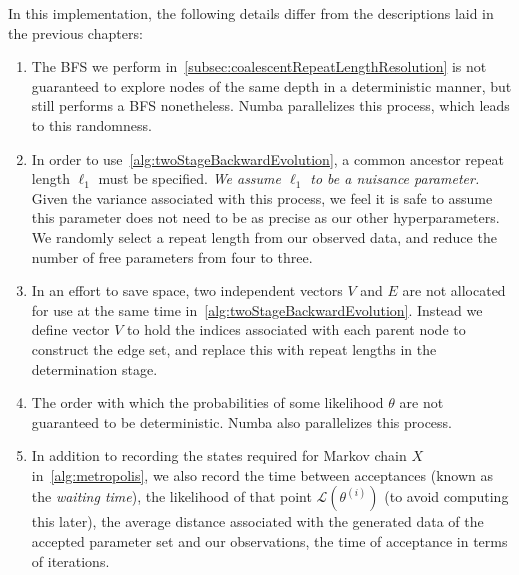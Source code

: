 In this implementation, the following details differ from the descriptions laid in the previous chapters:
\begin{enumerate}
    \item The BFS we perform in~\autoref{subsec:coalescentRepeatLengthResolution} is not guaranteed to explore nodes
        of the same depth in a deterministic manner, but still performs a BFS nonetheless.
        Numba parallelizes this process, which leads to this randomness.
    \item In order to use~\autoref{alg:twoStageBackwardEvolution}, a common ancestor repeat length $\ell_1$ must be
        specified.
        \emph{We assume $\ell_1$ to be a nuisance parameter.}
        Given the variance associated with this process, we feel it is safe to assume this parameter does not need to be
        as precise as our other hyperparameters.
        We randomly select a repeat length from our observed data, and reduce the number of free parameters from
        four to three.
    \item In an effort to save space, two independent vectors $V$ and $E$ are not allocated for use at the same time
        in~\autoref{alg:twoStageBackwardEvolution}.
        Instead we define vector $V$ to hold the indices associated with each parent node to construct the edge set,
        and replace this with repeat lengths in the determination stage.
    \item The order with which the probabilities of some likelihood $\mathcal{\theta}$ are not guaranteed to be
        deterministic.
        Numba also parallelizes this process.
    \item In addition to recording the states required for Markov chain $X$ in~\autoref{alg:metropolis}, we also record
        the time between acceptances (known as the \emph{waiting time}), the likelihood of that point
        $\mathcal{L}(\theta^{(i)})$ (to avoid computing this later), the average distance associated with the generated
        data of the accepted parameter set and our observations, the time of acceptance in terms of iterations.
\end{enumerate}

